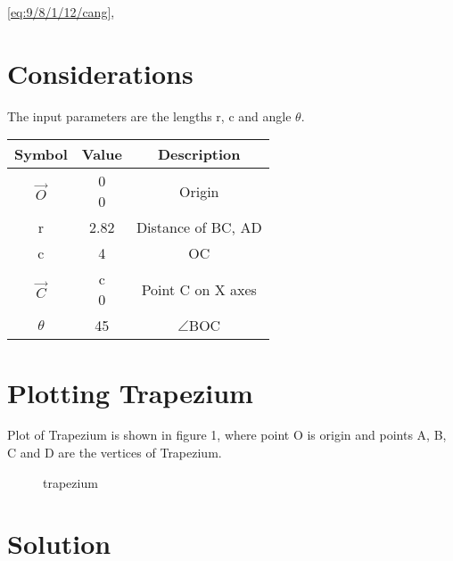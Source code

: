 \documentclass[journal,10pt,twocolumn]{article}
\begin{document}
	 \eqref{eq:9/8/1/12/cang},
\section{Considerations}
\vspace{0.2cm}
The input parameters are the lengths r, c and angle $\theta$. \\
\vspace{0.2cm}
{


\setlength\extrarowheight{2pt}
\begin{tabular}{|c|c|c|}
	\hline
	\textbf{Symbol}&\textbf{Value}&\textbf{Description}\\
	\hline
	$\vec{O}$ & \myvec{0\\0}
	&Origin\\
	\hline
	r&2.82& Distance of BC, AD\\
	\hline
	c&4&OC\\
	
	\hline
	$\vec{C}$ & \myvec{c \\ 0}

	&Point C on X axes
	\\
\hline
	$\theta$&45 \textdegree &$\angle$BOC\\
	\hline
\end{tabular}
}


\section{Plotting Trapezium}




\vspace{0.25cm}
Plot of Trapezium is shown in figure 1, where point O is origin and points A, B, C and D are the vertices of Trapezium.
\begin{figure}[H]

\caption{trapezium}
\label{fig:trapezium}
\end{figure}


\section{Solution}

\vspace{0.25cm}
\end{document}
